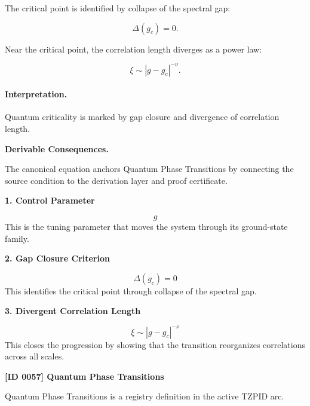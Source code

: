 The critical point is identified by collapse of the spectral gap:

\begin{equation}
\Delta(g_c)=0 .
\end{equation}

Near the critical point, the correlation length diverges as a power law:

\begin{equation}
\boxed{
\xi \sim |g-g_c|^{-\nu}.
}
\end{equation}

\paragraph{Interpretation.}
Quantum criticality is marked by gap closure and divergence of correlation length.

\par\vspace{0.35em}
\noindent\textbf{Derivable Consequences.}\quad
\begingroup
\footnotesize
\raggedright
The canonical equation anchors Quantum Phase Transitions by connecting the source condition to the derivation layer and proof certificate.
\par\endgroup

\noindent\textbf{1. Control Parameter}\par
\[
g
\]
\noindent This is the tuning parameter that moves the system through its ground-state family.\par
\noindent\textbf{2. Gap Closure Criterion}\par
\[
\Delta(g_{c}) = 0
\]
\noindent This identifies the critical point through collapse of the spectral gap.\par
\noindent\textbf{3. Divergent Correlation Length}\par
\[
\xi \sim |g-g_{c}|^{-\nu}
\]
\noindent This closes the progression by showing that the transition reorganizes correlations across all scales.\par

\clearpage
\noindent\textbf{[ID 0057] Quantum Phase Transitions}\par
\vspace{0.35em}
\begingroup\small
{}
Quantum Phase Transitions is a registry definition in the active TZPID arc.

